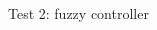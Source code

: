 \begin{multicols}{2}
            \begin{figure}[H]
                \centering
                \caption{Test 2: fuzzy controller}
                \label{fig:fuzzy_test2}
            \end{figure}

        \end{multicols}


\clearpage